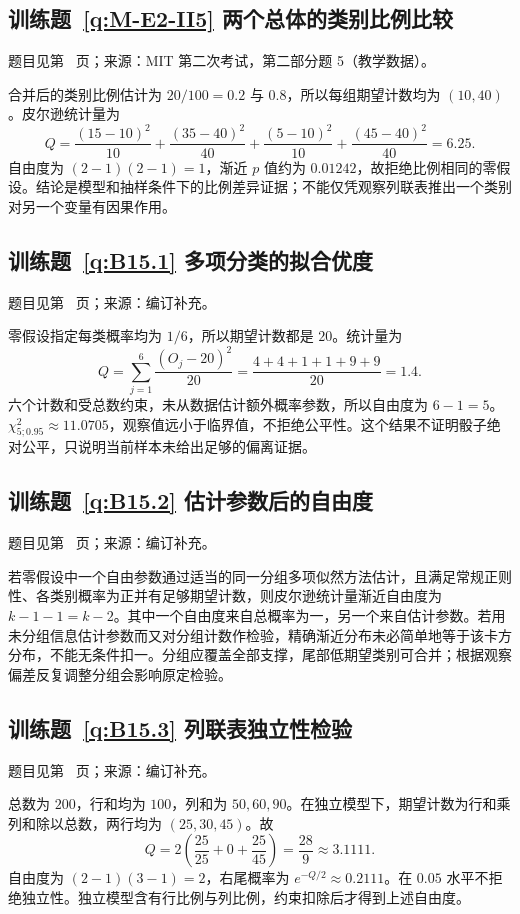 \documentclass[UTF8,12pt,a4paper,fontset=fandol]{ctexbook}
\begin{document}
\subsection*{训练题~\ref{q:M-E2-II5} 两个总体的类别比例比较}\label{a:M-E2-II5}{\small 题目见第~\pageref{q:M-E2-II5} 页；来源：MIT 第二次考试，第二部分题 5（教学数据）。}
\begin{solve}合并后的类别比例估计为 $20/100=0.2$ 与 $0.8$，所以每组期望计数均为 $(10,40)$。皮尔逊统计量为\[Q=\frac{(15-10)^2}{10}+\frac{(35-40)^2}{40}+\frac{(5-10)^2}{10}+\frac{(45-40)^2}{40}=6.25.\]自由度为 $(2-1)(2-1)=1$，渐近 $p$ 值约为 $0.01242$，故拒绝比例相同的零假设。结论是模型和抽样条件下的比例差异证据；不能仅凭观察列联表推出一个类别对另一个变量有因果作用。\end{solve}

\subsection*{训练题~\ref{q:B15.1} 多项分类的拟合优度}\label{a:B15.1}{\small 题目见第~\pageref{q:B15.1} 页；来源：编订补充。}
\begin{solve}零假设指定每类概率均为 $1/6$，所以期望计数都是 $20$。统计量为\[Q=\sum_{j=1}^6\frac{(O_j-20)^2}{20}=\frac{4+4+1+1+9+9}{20}=1.4.\]六个计数和受总数约束，未从数据估计额外概率参数，所以自由度为 $6-1=5$。$\chi^2_{5;0.95}\approx11.0705$，观察值远小于临界值，不拒绝公平性。这个结果不证明骰子绝对公平，只说明当前样本未给出足够的偏离证据。\end{solve}

\subsection*{训练题~\ref{q:B15.2} 估计参数后的自由度}\label{a:B15.2}{\small 题目见第~\pageref{q:B15.2} 页；来源：编订补充。}
\begin{solve}若零假设中一个自由参数通过适当的同一分组多项似然方法估计，且满足常规正则性、各类别概率为正并有足够期望计数，则皮尔逊统计量渐近自由度为 $k-1-1=k-2$。其中一个自由度来自总概率为一，另一个来自估计参数。若用未分组信息估计参数而又对分组计数作检验，精确渐近分布未必简单地等于该卡方分布，不能无条件扣一。分组应覆盖全部支撑，尾部低期望类别可合并；根据观察偏差反复调整分组会影响原定检验。\end{solve}

\subsection*{训练题~\ref{q:B15.3} 列联表独立性检验}\label{a:B15.3}{\small 题目见第~\pageref{q:B15.3} 页；来源：编订补充。}
\begin{solve}总数为 $200$，行和均为 $100$，列和为 $50,60,90$。在独立模型下，期望计数为行和乘列和除以总数，两行均为 $(25,30,45)$。故\[Q=2\left(\frac{25}{25}+0+\frac{25}{45}\right)=\frac{28}{9}\approx3.1111.\]自由度为 $(2-1)(3-1)=2$，右尾概率为 $e^{-Q/2}\approx0.2111$。在 $0.05$ 水平不拒绝独立性。独立模型含有行比例与列比例，约束扣除后才得到上述自由度。\end{solve}
\end{document}
